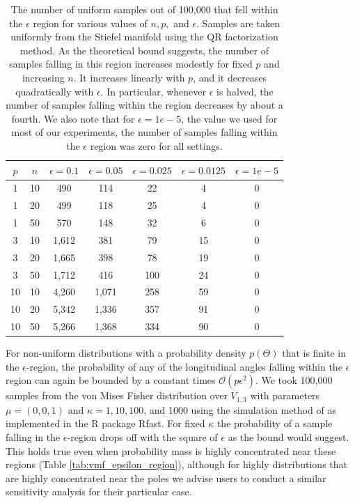 \documentclass[ba]{imsart}
\numberwithin{equation}{section}
\theoremstyle{plain}
\begin{document}
\begin{table}
\begin{tabular}{|cc||ccccc|}
\hline
$p$ & $n$  & $\epsilon = 0.1$ & $\epsilon = 0.05$ & $\epsilon = 0.025$ & $\epsilon = 0.0125$ & $\epsilon = 1e-5$\\
\hline
\hline
1 & 10 & 490 & 114 & 22 & 4 & 0\\
1 & 20 & 499 & 118 & 25 & 4 & 0\\
1 & 50 & 570 & 148 & 32 & 6 & 0 \\
\hline
3 & 10 & 1,612 & 381 & 79  & 15 & 0\\
3 & 20 & 1,665 & 398 & 78 & 19 & 0\\
3 & 50 & 1,712 & 416 & 100  & 24 & 0\\
\hline
10 & 10 & 4,260 & 1,071 & 258 & 59 & 0\\
10 & 20 & 5,342 & 1,336 & 357 & 91 & 0\\
10 & 50 & 5,266 & 1,368 & 334 & 90 & 0 \\
\hline
\end{tabular}
\caption{The number of uniform samples out of 100,000 that fell within the $\epsilon$ region for various values of $n, p,$ and $\epsilon$. Samples are taken uniformly from the Stiefel manifold using the QR factorization method. As the theoretical bound suggests, the number of samples falling in this region increases modestly for fixed $p$ and increasing $n$. It increases linearly with $p$, and it decreases quadratically with $\epsilon$. In particular, whenever $\epsilon$ is halved, the number of samples falling within the region decreases by about a fourth. We also note that for $\epsilon = 1e-5$, the value we used for most of our experiments, the number of samples falling within the $\epsilon$ region was zero for all settings.}
\label{tab:uniform_epsilon_region}
\end{table}

\noindent For non-uniform distributions with a probability density $p(\Theta)$ that is finite in the $\epsilon$-region, the probability of any of the longitudinal angles falling within the $\epsilon$ region can again be bounded by a constant times $\mathcal{O}(p \epsilon^2)$. We took 100,000 samples from the von Mises Fisher distribution over $V_{1,3}$ with parameters $\mu = (0,0,1)$ and $\kappa = 1, 10, 100$, and 1000 using the simulation method of \citet{wood1994simulation} as implemented in the R package Rfast. For fixed $\kappa$ the probability of a sample falling in the $\epsilon$-region drops off with the square of $\epsilon$ as the bound would suggest. This holds true even when probability mass is highly concentrated near these regions (Table \ref{tab:vmf_epsilon_region}), although for highly distributions that are highly concentrated near the poles we advise users to conduct a similar sensitivity analysis for their particular case.  
\end{document}

